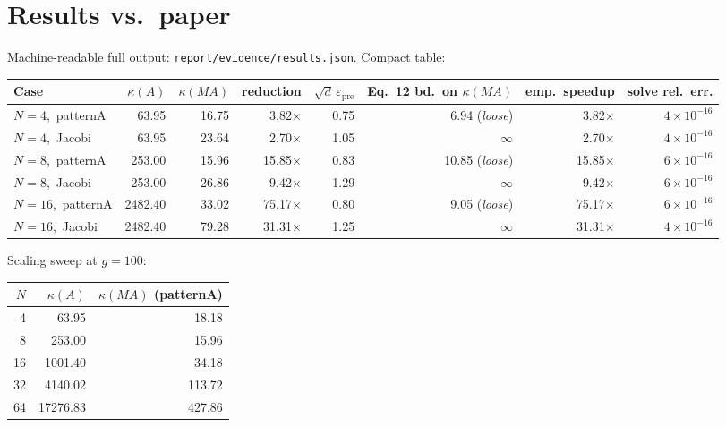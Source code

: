 \documentclass[11pt]{article}
\begin{document}
\section{Results vs.\ paper}

Machine-readable full output: \texttt{report/evidence/results.json}.
Compact table:

\begin{center}
\small
\begin{tabular}{lrrrrrrr}
\toprule
Case & $\kappa(A)$ & $\kappa(MA)$ & reduction & $\sqrt d\,\varepsilon_{\mathrm{pre}}$ & Eq.~12 bd.\ on $\kappa(MA)$ & emp.\ speedup & solve rel.\ err. \\
\midrule
$N{=}4$,\, patternA  &   63.95 &   16.75 &   3.82$\times$ & 0.75 & 6.94 (\emph{loose}) &   3.82$\times$ & $4\!\times\!10^{-16}$ \\
$N{=}4$,\, Jacobi    &   63.95 &   23.64 &   2.70$\times$ & 1.05 & $\infty$            &   2.70$\times$ & $4\!\times\!10^{-16}$ \\
$N{=}8$,\, patternA  &  253.00 &   15.96 &  15.85$\times$ & 0.83 & 10.85 (\emph{loose})&  15.85$\times$ & $6\!\times\!10^{-16}$ \\
$N{=}8$,\, Jacobi    &  253.00 &   26.86 &   9.42$\times$ & 1.29 & $\infty$            &   9.42$\times$ & $6\!\times\!10^{-16}$ \\
$N{=}16$,\, patternA & 2482.40 &   33.02 &  75.17$\times$ & 0.80 & 9.05 (\emph{loose}) &  75.17$\times$ & $6\!\times\!10^{-16}$ \\
$N{=}16$,\, Jacobi   & 2482.40 &   79.28 &  31.31$\times$ & 1.25 & $\infty$            &  31.31$\times$ & $4\!\times\!10^{-16}$ \\
\bottomrule
\end{tabular}
\end{center}

Scaling sweep at $g=100$:

\begin{center}
\begin{tabular}{rrr}
\toprule
$N$ & $\kappa(A)$ & $\kappa(MA)$ (patternA) \\
\midrule
 4 &     63.95 &  18.18 \\
 8 &    253.00 &  15.96 \\
16 &   1001.40 &  34.18 \\
32 &   4140.02 & 113.72 \\
64 &  17276.83 & 427.86 \\
\bottomrule
\end{tabular}
\end{center}
\end{document}
